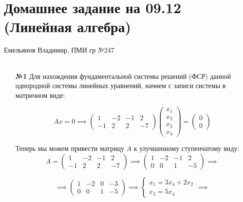 \documentclass[a4paper]{article}
\newcommand{\case}[1]{\begin{cases} #1 \end{cases}}
\begin{document}
\section*{Домашнее задание на 09.12 (Линейная алгебра)}
 {\large Емельянов Владимир, ПМИ гр №247}\\\\
\begin{enumerate}
    \item[\textbf{№1}] Для нахождения фундаментальной системы решений (ФСР) данной однородной системы линейных уравнений, начнем с записи системы в матричном виде:
    
    $$Ax = 0 \implies
    \begin{pmatrix}
    1 & -2 & -1 & 2 \\
    -1 & 2 & 2 & -7
    \end{pmatrix}
    \begin{pmatrix}
    x_1 \\
    x_2 \\
    x_3 \\
    x_4
    \end{pmatrix}
    =
    \begin{pmatrix}
    0 \\
    0
    \end{pmatrix}
    $$
    
    Теперь мы можем привести матрицу $A$ к улучшенному ступенчатому виду:
    $$A = \begin{pmatrix}
    1 & -2 & -1 & 2 \\
    -1 & 2 & 2 & -7
    \end{pmatrix} \implies \begin{pmatrix}
        1 & -2 & -1 & 2 \\
        0 & 0 & 1 & -5
        \end{pmatrix} \implies $$

    $$\implies \begin{pmatrix}
        1 & -2 & 0 & -3 \\
        0 & 0 & 1 & -5
        \end{pmatrix} \implies \case{x_1 = 3x_4+2x_2 \\ x_3 = 5x_4} \implies$$
    

\end{enumerate}
\end{document}
